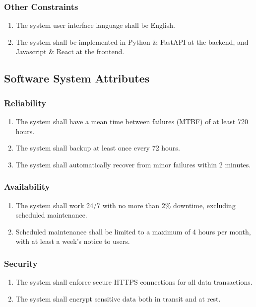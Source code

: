 \subsubsection{Other Constraints}
\begin{enumerate}[resume]
    \item The system user interface language shall be English.
    \item The system shall be implemented in Python \& FastAPI at the backend, and Javascript \& React at the frontend.
\end{enumerate}



\subsection{Software System Attributes}
\subsubsection{Reliability}
\begin{enumerate}[resume]
    \item The system shall have a mean time between failures (MTBF) of at least 720 hours.
    \item The system shall backup at least once every 72 hours.
    \item The system shall automatically recover from minor failures within 2 minutes.
\end{enumerate}

\subsubsection{Availability}
\begin{enumerate}[resume]
    \item The system shall work 24/7 with no more than 2\% downtime, excluding scheduled maintenance.
    \item Scheduled maintenance shall be limited to a maximum of 4 hours per month, with at least a week's notice to users.
\end{enumerate}

\subsubsection{Security}
\begin{enumerate}[resume]
    \item The system shall enforce secure HTTPS connections for all data transactions.
    \item The system shall encrypt sensitive data both in transit and at rest.
\end{enumerate}

